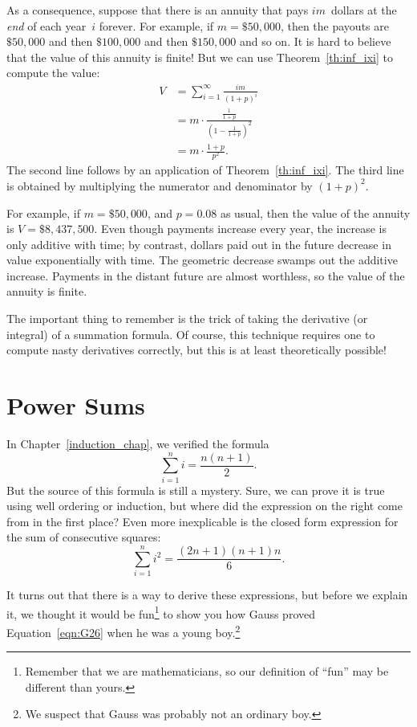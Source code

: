 As a consequence, suppose that there is an annuity that pays
$im$~dollars at the \emph{end} of each year~$i$ forever.  For example,
if $m = \$50,000$, then the payouts are $\$50,000$ and then
$\$100,000$ and then $\$150,000$ and so on.  It is hard to believe
that the value of this annuity is finite!  But we can use
Theorem~\ref{th:inf_ixi} to compute the value:
\begin{align*}
V & = \sum_{i=1}^\infty \frac{im}{(1+p)^i} \\
  & = m \cdot \frac{\frac{1}{1+p}}{(1 - \frac{1}{1+p})^2} \\
  & = m \cdot \frac{1+p}{p^2}.
\end{align*}
The second line follows by an application of Theorem~\ref{th:inf_ixi}.
The third line is obtained by multiplying the numerator and
denominator by $(1+p)^2$.

For example, if $m = \$50,000$, and $p = 0.08$ as usual, then the
value of the annuity is $V = \$8,437,500$.  Even though payments
increase every year, the increase is only additive with time; by
contrast, dollars paid out in the future decrease in value
exponentially with time.  The geometric decrease swamps out the
additive increase.  Payments in the distant future are almost
worthless, so the value of the annuity is finite.

The important thing to remember is the trick of taking the derivative
(or integral) of a summation formula.  Of course, this technique
requires one to compute nasty derivatives correctly, but this is at
least theoretically possible!

\section{Power Sums}

In Chapter~\ref{induction_chap}, we verified the formula
\begin{equation}\label{eqn:G26}
    \sum_{i = 1}^n i = \frac{n (n + 1)}{2}.
\end{equation}
But the source of this formula is still a mystery.  Sure, we can prove
it is true using well ordering or induction, but where did the
expression on the right come from in the first place?  Even more
inexplicable is the closed form expression for the sum of consecutive
squares:
\begin{equation}\label{eqn:G27}
    \sum_{i = 1}^n i^2 = \frac{(2n+1) (n+1) n}{6}.
\end{equation}

It turns out that there is a way to derive these expressions, but
before we explain it, we thought it would be fun\footnote{Remember
  that we are mathematicians, so our definition of ``fun'' may be
  different than yours.} to show you how Gauss proved
Equation~\ref{eqn:G26} when he was a young boy.\footnote{We suspect
  that Gauss was probably not an ordinary boy.}

